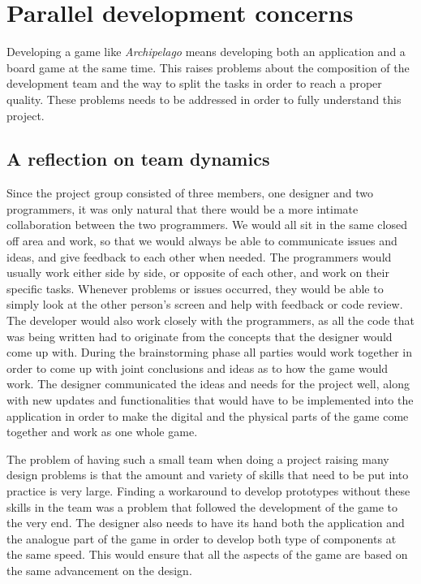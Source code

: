 \section{Parallel development concerns}

Developing a game like \textit{Archipelago} means developing both an application and a board game at the same time. This raises problems about the composition of the development team and the way to split the tasks in order to reach a proper quality. These problems needs to be addressed in order to fully understand this project.

\subsection{A reflection on team dynamics}
Since the project group consisted of three members, one designer and two programmers, it was only natural that there would be a more intimate collaboration between the two programmers. We would all sit in the same closed off area and work, so that we would always be able to communicate issues and ideas, and give feedback to each other when needed. The programmers would usually work either side by side, or opposite of each other, and work on their specific tasks. Whenever problems or issues occurred, they would be able to simply look at the other person's screen and help with feedback or code review. The developer would also work closely with the programmers, as all the code that was being written had to originate from the concepts that the designer would come up with. During the brainstorming phase all parties would work together in order to come up with joint conclusions and ideas as to how the game would work. The designer communicated the ideas and needs for the project well, along with new updates and functionalities that would have to be implemented into the application in order to make the digital and the physical parts of the game come together and work as one whole game. 

The problem of having such a small team when doing a project raising many design problems is that the amount and variety of skills that need to be put into practice is very large. Finding a workaround to develop prototypes without these skills in the team was a problem that followed the development of the game to the very end. The designer also needs to have its hand both the application and the analogue part of the game in order to develop both type of components at the same speed. This would ensure that all the aspects of the game are based on the same advancement on the design.

